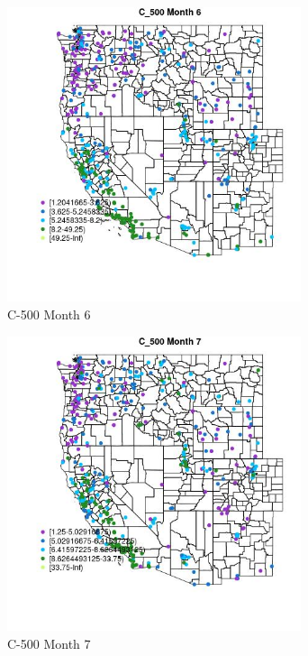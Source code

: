 \begin{figure} 
\centering  
\includegraphics[width=0.77\textwidth]{Code_Outputs/ML_input_report_ML_input_PM25_Step5_part_d_de_duplicated_aves_ML_input_MapObsMo6C_500.jpg} 
\caption{\label{fig:ML_input_report_ML_input_PM25_Step5_part_d_de_duplicated_aves_ML_inputMapObsMo6C_500}C-500 Month 6} 
\end{figure} 
 

\begin{figure} 
\centering  
\includegraphics[width=0.77\textwidth]{Code_Outputs/ML_input_report_ML_input_PM25_Step5_part_d_de_duplicated_aves_ML_input_MapObsMo7C_500.jpg} 
\caption{\label{fig:ML_input_report_ML_input_PM25_Step5_part_d_de_duplicated_aves_ML_inputMapObsMo7C_500}C-500 Month 7} 
\end{figure} 
 

